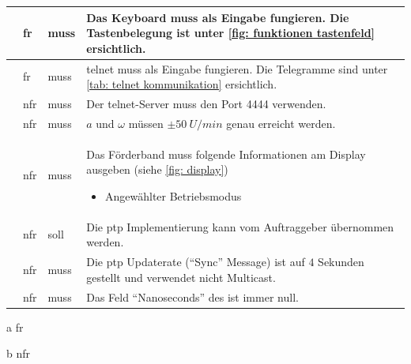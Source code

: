 \documentclass[./\jobname.tex]{subfiles}
\begin{document}
\begin{table}[H]
{\begin{threeparttable}
\begin{tabular}{Y{0.5cm}Y{0.75cm}Y{2.65cm}m{10cm}}
				 & \acrshort{fr} & muss& Das Keyboard muss als Eingabe fungieren. Die Tastenbelegung ist unter \autoref{fig: funktionen tastenfeld} ersichtlich. \\ \hline
				 & \acrshort{fr} & muss& \gls{telnet} muss als Eingabe fungieren. Die Telegramme sind unter \autoref{tab: telnet kommunikation} ersichtlich. \\ \hline
				 & \acrshort{nfr}& muss & Der \gls{telnet}-Server muss den Port 4444 verwenden. \\ \hline
				 & \acrshort{nfr} & muss& \(a\) und \(\omega\) müssen \(\pm 50~U/min\) genau erreicht werden.\\ \hline %
				 & \acrshort{nfr} & muss & Das Förderband muss folgende Informationen am Display ausgeben (siehe \autoref{fig: display})
				\begin{itemize}
					\item Angewählter Betriebsmodus
				\end{itemize}\\ \hline
			 & \acrshort{nfr} & soll & Die \acrshort{ptp} Implementierung kann vom Auftraggeber übernommen werden. \\ \hline
			 & \acrshort{nfr} & muss & Die \acrshort{ptp} Updaterate (\enquote{Sync} Message) ist auf \(4\) Sekunden gestellt und verwendet nicht Multicast. \\ \hline
			 & \acrshort{nfr} & muss & Das Feld \enquote{Nanoseconds} des  ist immer null. \\ \hline	
			\end{tabular}
			
			\label{tab: Allgemeine funktionale Anforderungen}
			\begin{tablenotes}
				\footnotesize
				\item [a] \acrfull{fr}
				\item [b] \acrfull{nfr} 
			\end{tablenotes}
		\end{threeparttable}
	}
\end{table}
%
\end{document}
